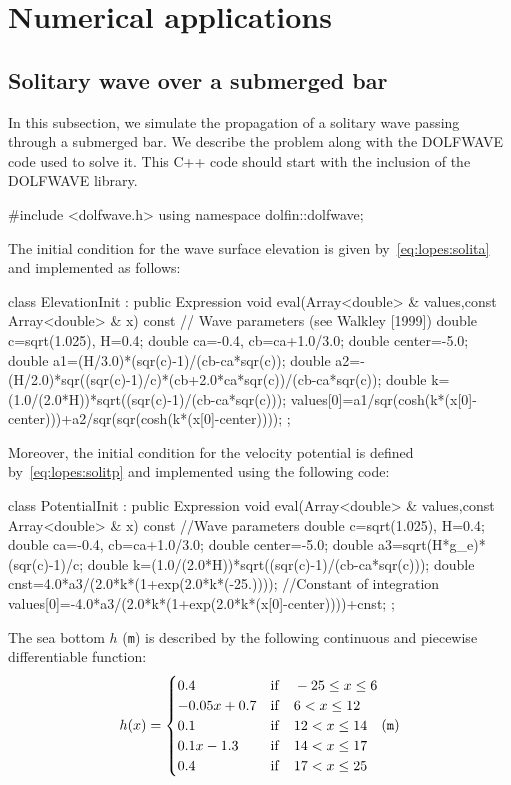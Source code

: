 \section{Numerical applications}\label{sec:lopes:numericaltests}
\subsection{Solitary wave over a submerged bar}
In this subsection, we simulate the propagation of a
solitary wave passing through a submerged bar.  We describe
the problem along with the DOLFWAVE code used to solve
it. This C++ code should start with the inclusion of the
DOLFWAVE library.
\begin{c++}
#include <dolfwave.h>
using namespace dolfin::dolfwave;
\end{c++}
The initial condition for the wave surface elevation is
given by~\eqref{eq:lopes:solita} and implemented as follows:
\begin{c++}
class ElevationInit : public Expression
{
  void eval(Array<double> & values,const Array<double> & x) const
  { // Wave parameters (see Walkley [1999])
    double c=sqrt(1.025), H=0.4;
    double ca=-0.4, cb=ca+1.0/3.0;
    double center=-5.0;
    double a1=(H/3.0)*(sqr(c)-1)/(cb-ca*sqr(c));
    double a2=-(H/2.0)*sqr((sqr(c)-1)/c)*(cb+2.0*ca*sqr(c))/(cb-ca*sqr(c));
    double k=(1.0/(2.0*H))*sqrt((sqr(c)-1)/(cb-ca*sqr(c)));
    values[0]=a1/sqr(cosh(k*(x[0]-center)))+a2/sqr(sqr(cosh(k*(x[0]-center))));
  }
};
\end{c++}
Moreover, the initial condition for the velocity potential
is defined by~\eqref{eq:lopes:solitp} and implemented using
the following code:
\begin{c++}
class PotentialInit :  public Expression
{
  void eval(Array<double> & values,const Array<double> & x) const
  { //Wave parameters
    double c=sqrt(1.025), H=0.4;
    double ca=-0.4, cb=ca+1.0/3.0;
    double center=-5.0;
    double a3=sqrt(H*g_e)*(sqr(c)-1)/c;
    double k=(1.0/(2.0*H))*sqrt((sqr(c)-1)/(cb-ca*sqr(c)));
    double cnst=4.0*a3/(2.0*k*(1+exp(2.0*k*(-25.)))); //Constant of integration
    values[0]=-4.0*a3/(2.0*k*(1+exp(2.0*k*(x[0]-center))))+cnst;
  }
};
\end{c++}
The sea bottom $h$ ({\tt m}) is described by the following
continuous and piecewise differentiable function:
\begin{equation}\label{eq:lopes:piecewisebottom}
h(x)=\begin{cases}
0.4& {\rm if}\quad -25 \leq x\leq 6\\
-0.05x+0.7& {\rm if}\quad 6< x\leq 12\\
0.1& {\rm if}\quad 12< x\leq 14\\
0.1x-1.3& {\rm if}\quad 14< x\leq 17\\
0.4& {\rm if}\quad 17< x\leq 25
\end{cases}  ({\tt m})
\end{equation}
